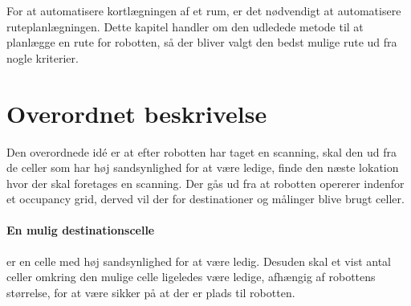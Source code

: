 
\newcommand{\unkcell}[3][]{\node (robot) [draw,fill=yellow, text centered, rectangle,
minimum height=\cellsize cm,minimum width=\cellsize cm, align=right] at ($(#2*\cellsize,#3*\cellsize) + (\cellsize/2,\cellsize/2)$) {$\scriptstyle #1$};}

\newcommand{\emptycell}[3][]{\node (robot) [draw,fill=green, text centered, rectangle,
minimum height=\cellsize cm,minimum width=\cellsize cm, align=right] at ($(#2*\cellsize,#3*\cellsize) + (\cellsize/2,\cellsize/2)$) {$\scriptstyle #1$};}

\newcommand{\occcell}[3][]{\node (robot) [draw,fill=red, text centered, rectangle,
minimum height=\cellsize cm,minimum width=\cellsize cm, align=right] at ($(#2*\cellsize,#3*\cellsize) + (\cellsize/2,\cellsize/2)$) {$\scriptstyle #1$};}

\newcommand{\scancell}[3][]{\node (robot) [draw,fill=orange, text centered, rectangle,
minimum height=\cellsize cm,minimum width=\cellsize cm, align=right] at ($(#2*\cellsize,#3*\cellsize) + (\cellsize/2,\cellsize/2)$) {$\scriptstyle #1$};}

\newcommand{\destcell}[3][]{\node (robot) [draw,fill=blue, text centered, rectangle,
minimum height=\cellsize cm,minimum width=\cellsize cm, align=right] at ($(#2*\cellsize,#3*\cellsize) + (\cellsize/2,\cellsize/2)$) {$\scriptstyle #1$};}

For at automatisere kortlægningen af et rum, er det nødvendigt at automatisere ruteplanlægningen.
Dette kapitel handler om den udledede metode til at planlægge en rute for robotten, så der bliver valgt den bedst mulige rute ud fra nogle kriterier.

\section{Overordnet beskrivelse}
Den overordnede idé er at efter robotten har taget en scanning, skal den ud fra de celler som har høj sandsynlighed for at være ledige, finde den næste lokation hvor der skal foretages en scanning.
Der gås ud fra at robotten opererer indenfor et occupancy grid, derved vil der for destinationer og målinger blive brugt celler.

\paragraph{En mulig destinationscelle} er en celle med høj sandsynlighed for at være ledig.
Desuden skal et vist antal celler omkring den mulige celle ligeledes være ledige, afhængig af robottens størrelse, for at være sikker på at der er plads til robotten.

